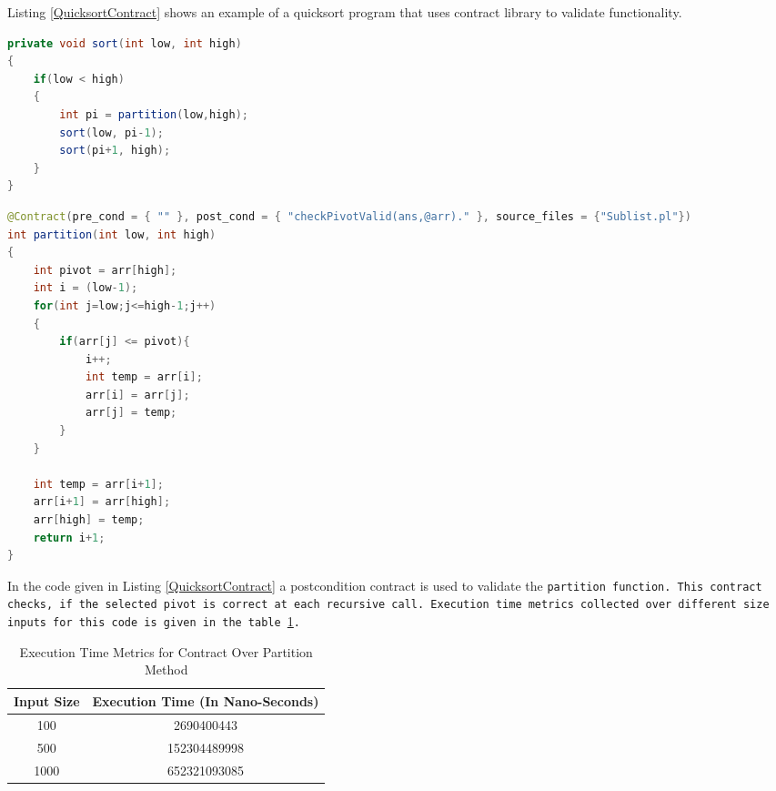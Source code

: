 Listing \ref{QuicksortContract} shows an example of a quicksort program that uses contract library to validate functionality.\linebreak

\begin{minipage}{\linewidth}
\begin{lstlisting}[frame=single, language=Java, caption={Quicksort Program with Contract - 1}, label={QuicksortContract}, captionpos=b, breaklines=true]
private void sort(int low, int high)
{
	if(low < high)
	{
		int pi = partition(low,high);
		sort(low, pi-1);
		sort(pi+1, high);
	}
}

\end{lstlisting}
\end{minipage}

\vspace{5mm}

\begin{minipage}{\linewidth}
\begin{lstlisting}[frame=single, language=Java, caption={Quicksort Program with Contract - 1}, label={QuicksortContract}, captionpos=b, breaklines=true]	
@Contract(pre_cond = { "" }, post_cond = { "checkPivotValid(ans,@arr)." }, source_files = {"Sublist.pl"})
int partition(int low, int high)
{
	int pivot = arr[high];
	int i = (low-1);
	for(int j=low;j<=high-1;j++)
	{
		if(arr[j] <= pivot){
			i++;
			int temp = arr[i];
			arr[i] = arr[j];
			arr[j] = temp;
		}
	}
		
	int temp = arr[i+1];
	arr[i+1] = arr[high];
	arr[high] = temp;	
	return i+1;
}
\end{lstlisting}
\end{minipage}


In the code given in Listing \ref{QuicksortContract} a postcondition contract is used to validate the \tt{partition} function. This contract checks, if the selected pivot is correct at each recursive call. Execution time metrics collected over different size inputs for this code is given in the table \ref{tab:PartitionWithContracts}.

\begin{table}[htb]
\caption{Execution Time Metrics for Contract Over Partition Method\label{tab:PartitionWithContracts}}
\begin{center}
\begin{tabular}{c||c}
\hline
Input Size & Execution Time (In Nano-Seconds) \\
\hline
\hline
100 & 2690400443\\
500 & 152304489998\\
1000 & 652321093085\\

\hline
\end{tabular}
\end{center}
\end{table}

